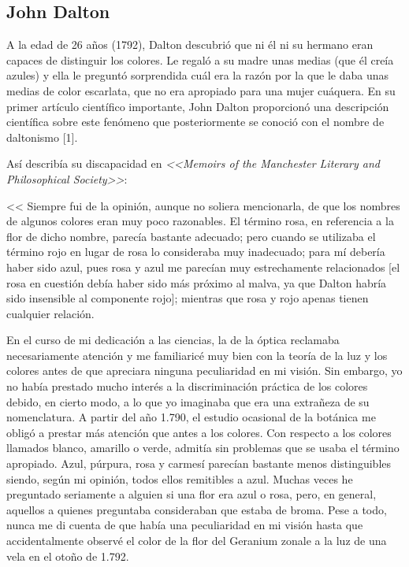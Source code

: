 \documentclass[10pt]{article}
\begin{document}
\subsection{John Dalton}

A la edad de 26 años (1792), Dalton descubrió que ni él ni su hermano eran capaces de distinguir los colores. Le regaló a su madre unas medias (que él creía azules) y ella le preguntó sorprendida cuál era la razón por la que le daba unas medias de color escarlata, que no era apropiado para una mujer cuáquera. En su primer artículo científico importante, John Dalton proporcionó una descripción científica sobre este fenómeno que posteriormente se conoció con el nombre de daltonismo [1].

\setlength{\parskip}{2mm}

Así describía su discapacidad en \textit{<<Memoirs of the Manchester Literary and Philosophical Society>>}:

<< Siempre fui de la opinión, aunque no soliera mencionarla, de que los nombres de algunos colores eran muy poco razonables. El término rosa, en referencia a la flor de dicho nombre, parecía bastante adecuado; pero cuando se utilizaba el término rojo en lugar de rosa lo consideraba muy inadecuado; para mí debería haber sido azul, pues rosa y azul me parecían muy estrechamente relacionados [el rosa en cuestión debía haber sido más próximo al malva, ya que Dalton habría sido insensible al componente rojo]; mientras que rosa y rojo apenas tienen cualquier relación. 

\setlength{\parskip}{2mm}

En el curso de mi dedicación a las ciencias, la de la óptica reclamaba necesariamente atención y me familiaricé muy bien con la teoría de la luz y los colores antes de que apreciara ninguna peculiaridad en mi visión. Sin embargo, yo no había prestado mucho interés a la discriminación práctica de los colores debido, en cierto modo, a lo que yo imaginaba que era una extrañeza de su nomenclatura. A partir del año 1.790, el estudio ocasional de la botánica me obligó a prestar más atención que antes a los colores. Con respecto a los colores llamados blanco, amarillo o verde, admitía sin problemas que se usaba el término apropiado. Azul, púrpura, rosa y carmesí parecían bastante menos distinguibles siendo, según mi opinión, todos ellos remitibles a azul. Muchas veces he preguntado seriamente a alguien si una flor era azul o rosa, pero, en general, aquellos a quienes preguntaba consideraban que estaba de broma. Pese a todo, nunca me di cuenta de que había una peculiaridad en mi visión hasta que accidentalmente observé el color de la flor del Geranium zonale a la luz de una vela en el otoño de 1.792.
\end{document}
